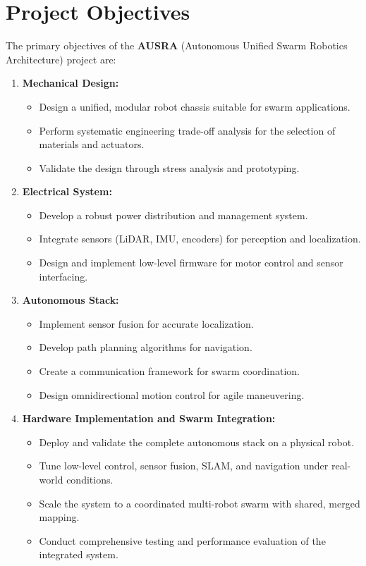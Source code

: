 \section{Project Objectives}
\label{sec:objectives}

The primary objectives of the \textbf{AUSRA} (Autonomous Unified Swarm Robotics Architecture) project are:

\begin{enumerate}
    \item \textbf{Mechanical Design:}
    \begin{itemize}
        \item Design a unified, modular robot chassis suitable for swarm applications.
        \item Perform systematic engineering trade-off analysis for the selection of materials and actuators.
        \item Validate the design through stress analysis and prototyping.
    \end{itemize}

    \item \textbf{Electrical System:}
    \begin{itemize}
        \item Develop a robust power distribution and management system.
        \item Integrate sensors (LiDAR, IMU, encoders) for perception and localization.
        \item Design and implement low-level firmware for motor control and sensor interfacing.
    \end{itemize}

    \item \textbf{Autonomous Stack:}
    \begin{itemize}
        \item Implement sensor fusion for accurate localization.
        \item Develop path planning algorithms for navigation.
        \item Create a communication framework for swarm coordination.
        \item Design omnidirectional motion control for agile maneuvering.
    \end{itemize}

    \item \textbf{Hardware Implementation and Swarm Integration:}
    \begin{itemize}
        \item Deploy and validate the complete autonomous stack on a physical robot.
        \item Tune low-level control, sensor fusion, SLAM, and navigation under real-world conditions.
        \item Scale the system to a coordinated multi-robot swarm with shared, merged mapping.
        \item Conduct comprehensive testing and performance evaluation of the integrated system.
    \end{itemize}
\end{enumerate}

